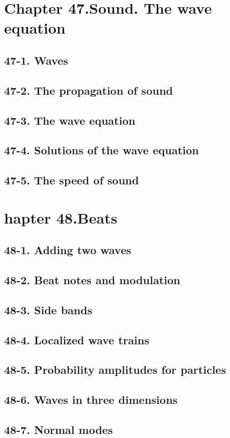 \documentclass{article}
\begin{document}
\section{Chapter 47.Sound. The wave equation}
\subsection{47-1. Waves}
\subsection{47-2. The propagation of sound}
\subsection{47-3. The wave equation}
\subsection{47-4. Solutions of the wave equation}
\subsection{47-5. The speed of sound}
\section{hapter 48.Beats}
\subsection{48-1. Adding two waves}
\subsection{48-2. Beat notes and modulation}
\subsection{48-3. Side bands}
\subsection{48-4. Localized wave trains}
\subsection{48-5. Probability amplitudes for particles}
\subsection{48-6. Waves in three dimensions}
\subsection{48-7. Normal modes}
\end{document}
